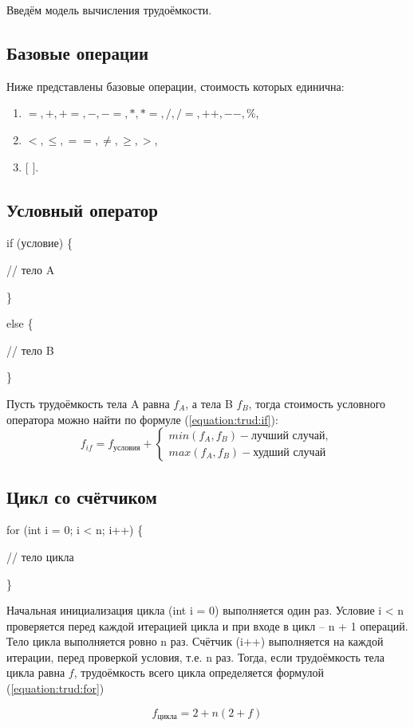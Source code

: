         Введём модель вычисления трудоёмкости.

        \subsection{Базовые операции}
            Ниже представлены базовые операции, стоимость которых единична:
            \begin{enumerate}
                \item $ =, +, +=, -, -=, *, *=,  /, /=, ++, --, \% $,
                \item $ <, \leqslant, ==, \neq, \geqslant , > $,
                \item $ [ $  $ ] $.
            \end{enumerate}
            
        \subsection{Условный оператор}
            if (условие) \{

                // тело A

            \}

            else \{

                // тело B
            
            \}

            Пусть трудоёмкость тела A равна $ f_A $, а тела B $ f_B $, тогда
            стоимость условного оператора можно найти по формуле (\ref{equation:trud:if}):
            \begin{equation}
                f_{if} = f_\text{условия} + \left\{
                    \begin{matrix}
                    min(f_A, f_B) - \text{лучший случай},\\
                    max(f_A, f_B) - \text{худший случай} 
                    \end{matrix}\right.
                \label{equation:trud:if}
            \end{equation}

        \subsection{Цикл со счётчиком}
            for (int i = 0; i < n; i++) \{

                // тело цикла

            \}
            
            Начальная инициализация цикла (int i = 0) выполняется один раз.
            Условие i < n проверяется перед каждой итерацией цикла и при входе в цикл -- n + 1 операций.
            Тело цикла выполняется ровно n раз.
            Счётчик (i++) выполняется на каждой итерации, перед проверкой условия, т.е. n раз.
            Тогда, если трудоёмкость тела цикла равна $ f $, трудоёмкость всего цикла определяется формулой (\ref{equation:trud:for})

            \begin{equation}
                f_\text{цикла} = 2 + n(2 + f)
                \label{equation:trud:for}
            \end{equation}
\newpage